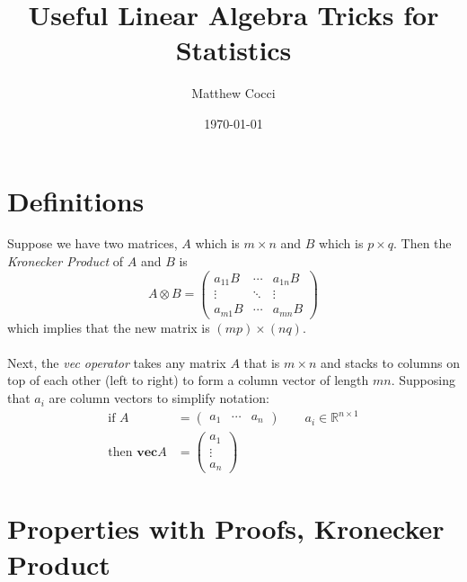 \documentclass[a4paper,12pt]{scrartcl}
\author{Matthew Cocci}
\title{Useful Linear Algebra Tricks for Statistics}
\date{\today}
\begin{document}
\maketitle

\section{Definitions}

Suppose we have two matrices, $A$ which is $m \times n$ and $B$
which is $p\times q$. Then the {\sl Kronecker Product} of $A$ and $B$ is 
    \[ A \otimes B = \begin{pmatrix} a_{11} B & \cdots & a_{1n} B \\
			    \vdots & \ddots & \vdots \\
			    a_{m1} B & \cdots & a_{mn}B \end{pmatrix}
    \]
which implies that the new matrix is $(mp) \times (nq)$. 
\\
\\
Next, the {\sl vec operator} takes any matrix $A$ that is $m \times n$
and stacks to columns on top of each other (left to right) to 
form a column vector of length $mn$.  Supposing that $a_i$ are column
vectors to simplify notation:
\begin{align*}
    \text{if } A &= \begin{pmatrix} a_1 & \cdots & a_n \end{pmatrix}
	\qquad a_i \in \mathbb{R}^{n\times 1} \\
    \text{then } \mathbf{vec} A &= 
	\begin{pmatrix} a_1 \\ \vdots \\ a_n \end{pmatrix}
\end{align*}

\newpage
\section{Properties with Proofs, Kronecker Product}
\end{document}
